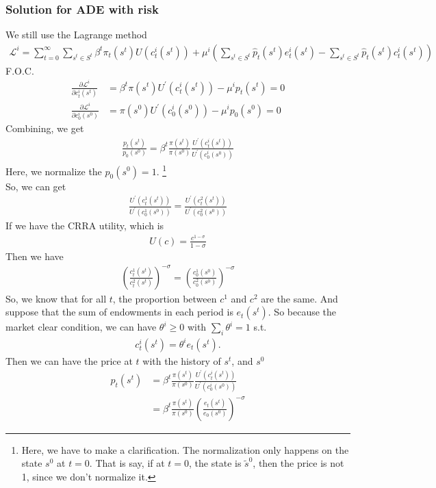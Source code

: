 \documentclass{article}
\begin{document}
\subsubsection{Solution for ADE with risk}
We still use the Lagrange method
\begin{align*}
	\mathscr{L}^i = \sum\limits^\infty_{t=0} \sum\limits_{s^t \in S^t} \beta^t \pi_t(s^t) U(c^i_t(s^t)) + \mu^i (\sum\limits_{s^t \in S^t} \hat{p}_t (s^t) e^i_t (s^t) - \sum\limits_{s^t \in S^t} \hat{p}_t (s^t) c^i_t (s^t))
\end{align*}
F.O.C.
\begin{align}
	\frac{\partial \mathscr{L}^i}{\partial c^i_t (s^t)} &= \beta^t \pi(s^t) U^\prime(c^i_t(s^t)) - \mu^i p_t(s^t) = 0\\
	\frac{\partial \mathscr{L}^i}{\partial c^i_0 (s^0)} &= \pi(s^0) U^\prime(c^i_0(s^0)) - \mu^i p_0(s^0) = 0
\end{align}
Combining, we get
\begin{align}
	\frac{p_t(s^t)}{p_0(s^0)} = \beta^t \frac{\pi(s^t)}{\pi(s^0)} \frac{U^\prime(c^i_t(s^t))}{U^\prime(c^i_0(s^0))}
\end{align}
Here, we normalize the $p_0(s^0) = 1$.
\footnote{Here, we have to make a clarification. The normalization only happens on the state $s^0$ at $t = 0$. That is say, if at $t = 0$, the state is $\tilde{s}^0$, then the price is not 1, since we don't normalize it.}\\
So, we can get
\begin{align}
	\frac{U^\prime(c^1_t(s^t))}{U^\prime(c^1_0(s^0))} = \frac{U^\prime(c^2_t(s^t))}{U^\prime(c^2_0(s^0))}
\end{align}
If we have the CRRA utility, which is
\begin{align}
	U(c) = \frac{c^{1 - \sigma}}{1 -\sigma}
\end{align}
Then we have
\begin{align}
	(\frac{c^1_t(s^t)}{c^2_t(s^t)})^{-\sigma} = (\frac{c^1_0(s^0)}{c^2_0(s^0)})^{-\sigma} 
\end{align}
So, we know that for all $t$, the proportion between $c^1$ and $c^2$ are the same. And suppose that the sum of endowments in each period is $e_t(s^t)$. So because the market clear condition, we can have $\theta^i \geq 0$ with $\sum_{i} \theta^i = 1$ s.t.
\begin{align}
	c^i_t(s^t) = \theta^i e_t(s^t). \label{eq: 5.2.3 7}
\end{align}
Then we can have the price at $t$ with the history of $s^t$, and $s^0$
\begin{align}
	p_t(s^t) &= \beta^t \frac{\pi(s^t)}{\pi(s^0)} \frac{U^\prime(c^i_t(s^t))}{U^\prime(c^i_0(s^0))} \nonumber \\
	&= \beta^t \frac{\pi(s^t)}{\pi(s^0)} (\frac{e_t(s^t)}{e_0(s^0)})^{-\sigma} \label{eq: 5.2.3 8}
\end{align}
\end{document}
